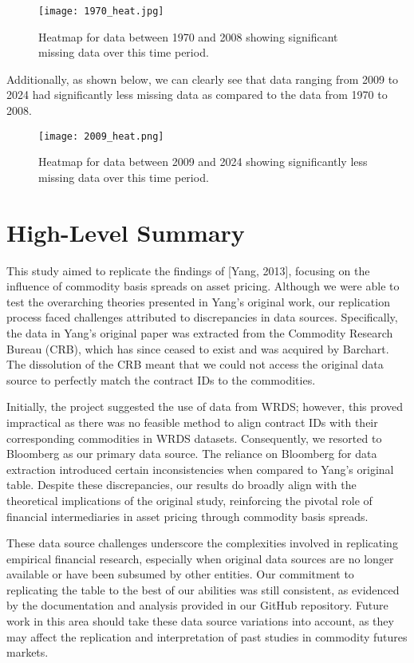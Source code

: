 \documentclass{article}
\begin{document}
\begin{figure}[h]
  \centering
  \texttt{[image: 1970\_heat.jpg]}
  \caption{Heatmap for data between 1970 and 2008 showing significant missing data over this time period.}
  \label{fig:my_graph}
\end{figure}

Additionally, as shown below, we can clearly see that data ranging from 2009 to 2024 had significantly less missing data as compared to the data from 1970 to 2008.

\begin{figure}[h]
  \centering
  \texttt{[image: 2009\_heat.png]}
  \caption{Heatmap for data between 2009 and 2024 showing significantly less missing data over this time period.}
  \label{fig:my_graph}
\end{figure}

\section{High-Level Summary}

This study aimed to replicate the findings of [Yang, 2013], focusing on the influence of commodity basis spreads on asset pricing. Although we were able to test the overarching theories presented in Yang’s original work, our replication process faced challenges attributed to discrepancies in data sources. Specifically, the data in Yang's original paper was extracted from the Commodity Research Bureau (CRB), which has since ceased to exist and was acquired by Barchart. The dissolution of the CRB meant that we could not access the original data source to perfectly match the contract IDs to the commodities.

Initially, the project suggested the use of data from WRDS; however, this proved impractical as there was no feasible method to align contract IDs with their corresponding commodities in WRDS datasets. Consequently, we resorted to Bloomberg as our primary data source. The reliance on Bloomberg for data extraction introduced certain inconsistencies when compared to Yang’s original table. Despite these discrepancies, our results do broadly align with the theoretical implications of the original study, reinforcing the pivotal role of financial intermediaries in asset pricing through commodity basis spreads.

These data source challenges underscore the complexities involved in replicating empirical financial research, especially when original data sources are no longer available or have been subsumed by other entities. Our commitment to replicating the table to the best of our abilities was still consistent, as evidenced by the documentation and analysis provided in our GitHub repository. Future work in this area should take these data source variations into account, as they may affect the replication and interpretation of past studies in commodity futures markets.
\end{document}
